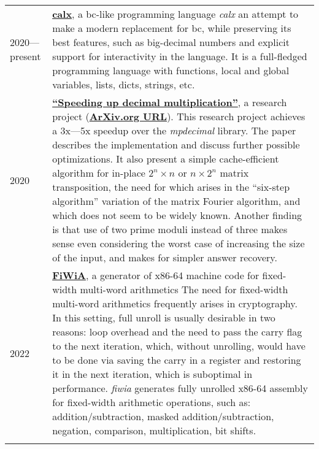 \documentclass[10pt]{article}
\begin{document}
\begin{tabularx}{\textwidth}{ l X }
    2020---present & \href{https://github.com/shdown/calx}{\textbf{calx}}, a bc-like programming language
    \newline
    \footnotesize{
        \textit{calx} an attempt to make a modern replacement for bc, while preserving its best features, such as big-decimal numbers and explicit support for interactivity in the language.
        It is a full-fledged programming language with functions, local and global variables, lists, dicts, strings, etc.
    }
    \\
    \medskip

    2020 & \href{https://github.com/shdown/decimal-multiplication-paper}{\textbf{``Speeding up decimal multiplication''}}, a research project (\href{https://arxiv.org/abs/2011.11524}{\textbf{ArXiv.org URL}}).
    \newline
    \footnotesize{
        This research project achieves a 3x---5x speedup over the \textit{mpdecimal} library.
        The paper describes the implementation and discuss further possible optimizations. It also present a simple cache-efficient algorithm for in-place
        $2^n \times n$ or $n \times 2^n$ matrix transposition, the need for which arises in the
        ``six-step algorithm'' variation of the matrix Fourier algorithm, and
        which does not seem to be widely known. Another finding is that use
        of two prime moduli instead of three makes sense even considering the
        worst case of increasing the size of the input, and makes for simpler
        answer recovery.
    }
    \\
    \medskip

    2022 & \href{https://github.com/shdown/fiwia}{\textbf{FiWiA}}, a generator of x86-64 machine code for fixed-width multi-word arithmetics
    \newline
    \footnotesize{
        The need for fixed-width multi-word arithmetics frequently arises in cryptography.
        In this setting, full unroll is usually desirable in two reasons: loop overhead and the need to pass the carry flag to the next iteration,
        which, without unrolling, would have to be done via saving the carry in a register and restoring it in the next iteration,
        which is suboptimal in performance.
        \textit{fiwia} generates fully unrolled x86-64 assembly for fixed-width arithmetic operations, such as:
        addition/subtraction,
        masked addition/subtraction,
        negation,
        comparison,
        multiplication,
        bit shifts.
    }
    \\
    \medskip


\end{tabularx}
\end{document}
